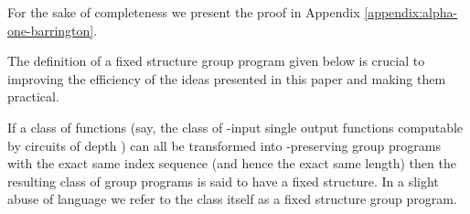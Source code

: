 For  the  sake  of  completeness  we present  the  proof  in  Appendix
\ref{appendix:alpha-one-barrington}. 

The  definition of  a  fixed structure group  program  given below  is
crucial to  improving the  efficiency of the  ideas presented  in this
paper and making them practical.

\begin{definition}
\label{def:fixed-structure}
  If a class  of functions (say, the class  of -input single output
  functions computable by circuits of  depth ) can all be
  transformed  into -preserving  group  programs with  the
  exact same index sequence (and hence the exact same length) then the
  resulting  class  of  group  programs   is  said  to  have  a  fixed
  structure.  In a  slight abuse  of language  we refer  to  the class
  itself as a fixed structure group program.
\end{definition}